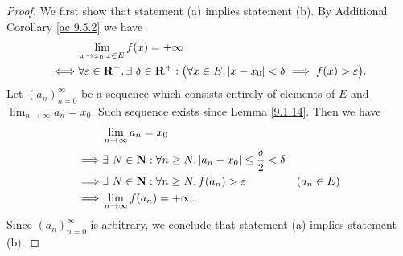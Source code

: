 \begin{proof}
    We first show that statement (a) implies statement (b).
    By Additional Corollary \ref{ac 9.5.2} we have
    \begin{align*}
             & \lim_{x \to x_0 ; x \in E} f(x) = +\infty                                                                                                                \\
        \iff & \forall \varepsilon \in \mathbf{R}^+, \exists\ \delta \in \mathbf{R}^+ : \big(\forall x \in E, \abs*{x - x_0} < \delta \implies f(x) > \varepsilon\big).
    \end{align*}
    Let \((a_n)_{n = 0}^\infty\) be a sequence which consists entirely of elements of \(E\) and \(\lim_{n \to \infty} a_n = x_0\).
    Such sequence exists since Lemma \ref{9.1.14}.
    Then we have
    \begin{align*}
                 & \lim_{n \to \infty} a_n = x_0                                                                               \\
        \implies & \exists\ N \in \mathbf{N} : \forall n \geq N, \abs*{a_n - x_0} \leq \frac{\delta}{2} < \delta               \\
        \implies & \exists\ N \in \mathbf{N} : \forall n \geq N, f(a_n) > \varepsilon                            & (a_n \in E) \\
        \implies & \lim_{n \to \infty} f(a_n) = +\infty.
    \end{align*}
    Since \((a_n)_{n = 0}^\infty\) is arbitrary, we conclude that statement (a) implies statement (b).


\end{proof}
